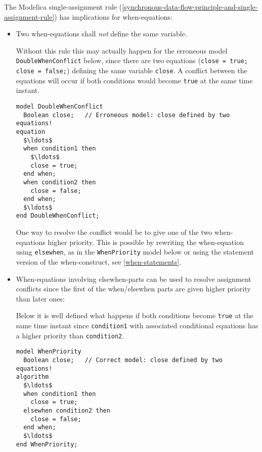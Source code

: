 The Modelica single-assignment rule (\cref{synchronous-data-flow-principle-and-single-assignment-rule}) has implications for
when-equations:
\begin{itemize}
\item
  Two when-equations shall \emph{not} define the same variable.

\begin{nonnormative}
Without this rule this may actually happen for the erroneous
model \lstinline!DoubleWhenConflict! below, since there are two equations
(\lstinline!close = true; close = false;!) defining the same variable
\lstinline!close!. A conflict between the equations will occur if both
conditions would become \lstinline!true! at the same time instant.
\begin{lstlisting}[language=modelica]
model DoubleWhenConflict
  Boolean close;   // Erroneous model: close defined by two equations!
equation
  $\ldots$
  when condition1 then
    $\ldots$
    close = true;
  end when;
  when condition2 then
    close = false;
  end when;
  $\ldots$
end DoubleWhenConflict;
\end{lstlisting}

One way to resolve the conflict would be to give one of the two
when-equations higher priority. This is possible by rewriting the
when-equation using \lstinline!elsewhen!, as in the \lstinline!WhenPriority! model
below or using the statement version of the when-construct, see \cref{when-statements}.
\end{nonnormative}

\item
  When-equations involving elsewhen-parts can be used to resolve
  assignment conflicts since the first of the when/elsewhen parts are
  given higher priority than later ones:
\begin{nonnormative}
Below it is well defined what happens if both conditions
become \lstinline!true! at the same time instant since \lstinline!condition1! with
associated conditional equations has a higher priority than \lstinline!condition2!.
\begin{lstlisting}[language=modelica]
model WhenPriority
  Boolean close;   // Correct model: close defined by two equations!
algorithm
  $\ldots$
  when condition1 then
    close = true;
  elsewhen condition2 then
    close = false;
  end when;
  $\ldots$
end WhenPriority;
\end{lstlisting}
\end{nonnormative}
\end{itemize}

